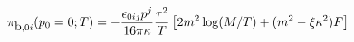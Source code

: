 \begin{equation}
{\cal{\pi}}_{\mbox{b}, 0i} (p_0=0;T) = -
\frac{\epsilon_{0ij}p^j}{16 \pi \kappa} \frac{\tau^2}{T}\left[2 m^2
\log(M/T) + (m^2 - \xi \kappa^2)F\right]
\end{equation}

